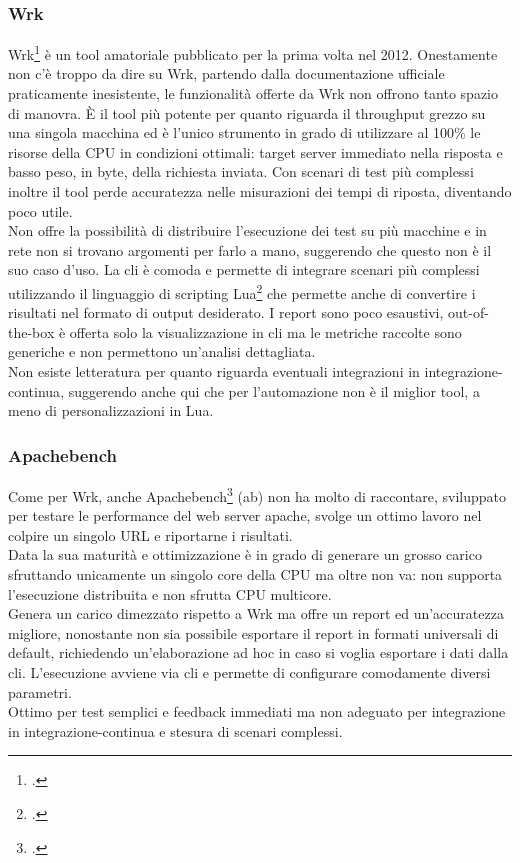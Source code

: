 \subsubsection{Wrk}
Wrk\footcite{site:wrk} è un tool amatoriale pubblicato per la prima volta nel 2012.
Onestamente non c'è troppo da dire su Wrk, partendo dalla documentazione ufficiale praticamente inesistente, le funzionalità offerte da Wrk non offrono tanto spazio di manovra.
È il tool più potente per quanto riguarda il throughput grezzo su una singola macchina ed è l'unico strumento in grado di utilizzare al 100\% le risorse della CPU in condizioni ottimali: target server immediato nella risposta e basso peso, in byte, della richiesta inviata. Con scenari di test più complessi inoltre il tool perde accuratezza nelle misurazioni dei tempi di riposta, diventando poco utile. \\
Non offre la possibilità di distribuire l'esecuzione dei test su più macchine e in rete non si trovano argomenti per farlo a mano, suggerendo che questo non è il suo caso d'uso.
La \gls{cli} è comoda e permette di integrare scenari più complessi utilizzando il linguaggio di scripting Lua\footcite{site:lua} che permette anche di convertire i risultati nel formato di output desiderato.
I report sono poco esaustivi, \gls{out-of-the-box} è offerta solo la visualizzazione in \gls{cli} ma le metriche raccolte sono generiche e non permettono un'analisi dettagliata.\\
Non esiste letteratura per quanto riguarda eventuali integrazioni in \gls{integrazione-continua}, suggerendo anche qui che per l'automazione non è il miglior tool, a meno di personalizzazioni in Lua.
\subsubsection{Apachebench}
Come per Wrk, anche Apachebench\footcite{site:ab} (ab) non ha molto di raccontare, sviluppato per testare le performance del web server apache, svolge un ottimo lavoro nel colpire un singolo URL e riportarne i risultati.\\
Data la sua maturità e ottimizzazione è in grado di generare un grosso carico sfruttando unicamente un singolo core della CPU ma oltre non va: non supporta l'esecuzione distribuita e non sfrutta CPU multicore. \\
Genera un carico dimezzato rispetto a Wrk ma offre un report ed un'accuratezza migliore, nonostante non sia possibile esportare il report in formati universali di default, richiedendo un'elaborazione ad hoc in caso si voglia esportare i dati dalla \gls{cli}.
L'esecuzione avviene via \gls{cli} e permette di configurare comodamente diversi parametri.\\
Ottimo per test semplici e feedback immediati ma non adeguato per integrazione in \gls{integrazione-continua} e stesura di scenari complessi.
